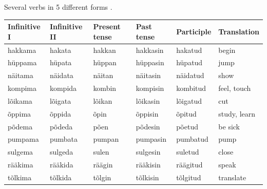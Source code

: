 \documentclass[a4paper, 12pt]{article}
\begin{document}
	Several verbs in 5 different forms \parencite{problems}.

\begin{table}[H]
\begin{tabular}{llllll}
\toprule
\textbf{Infinitive I} & \textbf{Infinitive II} & \textbf{Present tense} & \textbf{Past tense} & \textbf{Participle} & \textbf{Translation} \\
\midrule
hakkama               & hakata                 & hakkan                 & hakkasin            & hakatud             & begin                \\
\addlinespace[0.2cm]
hüppama               & hüpata                 & hüppan                 & hüppasin            & hüpatud             & jump                 \\
\addlinespace[0.2cm]
näitama               & näidata                & näitan                 & näitasin            & näidatud            & show                 \\
\addlinespace[0.2cm]
kompima               & kompida                & kombin                 & kompisin            & kombitud            & feel, touch          \\
\addlinespace[0.2cm]
lõikama               & lõigata                & lõikan                 & lõikasin            & lõigatud            & cut                  \\
\addlinespace[0.2cm]
õppima                & õppida                 & õpin                   & õppisin             & õpitud              & study, learn         \\
\addlinespace[0.2cm]
põdema                & põdeda                 & põen                   & põdesin             & põetud              & be sick              \\
\addlinespace[0.2cm]
pumpama               & pumbata                & pumpan                 & pumpasin            & pumbatud            & pump                 \\
\addlinespace[0.2cm]
sulgema               & sulgeda                & sulen                  & sulgesin            & suletud             & close                \\
\addlinespace[0.2cm]
rääkima               & rääkida                & räägin                 & rääkisin            & räägitud            & speak                \\
\addlinespace[0.2cm]
tõlkima               & tõlkida                & tõlgin                 & tõlkisin            & tõlgitud            & translate           \\
\bottomrule
\end{tabular}
\end{table}
\end{document}
